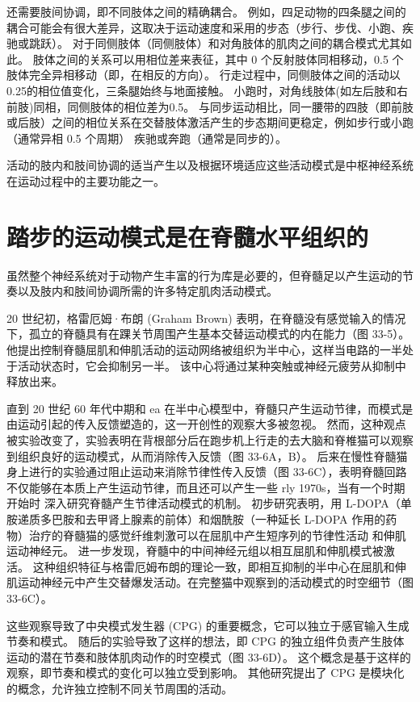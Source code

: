 还需要肢间协调，即不同肢体之间的精确耦合。 例如，四足动物的四条腿之间的耦合可能会有很大差异，这取决于运动速度和采用的步态（步行、步伐、小跑、疾驰或跳跃）。 对于同侧肢体（同侧肢体）和对角肢体的肌肉之间的耦合模式尤其如此。 肢体之间的关系可以用相位差来表征，其中 0 个反射肢体同相移动，0.5 个肢体完全异相移动（即，在相反的方向）。 行走过程中，同侧肢体之间的活动以0.25的相位值变化，三条腿始终与地面接触。 小跑时，对角线肢体(如左后肢和右前肢)同相，同侧肢体的相位差为0.5。 与同步运动相比，同一腰带的四肢（即前肢或后肢）之间的相位关系在交替肢体激活产生的步态期间更稳定，例如步行或小跑（通常异相 0.5 个周期） 疾驰或奔跑（通常是同步的）。

活动的肢内和肢间协调的适当产生以及根据环境适应这些活动模式是中枢神经系统在运动过程中的主要功能之一。


\section{踏步的运动模式是在脊髓水平组织的}
虽然整个神经系统对于动物产生丰富的行为库是必要的，但脊髓足以产生运动的节奏以及肢内和肢间协调所需的许多特定肌肉活动模式。

20 世纪初，格雷厄姆·布朗 (Graham Brown) 表明，在脊髓没有感觉输入的情况下，孤立的脊髓具有在踝关节周围产生基本交替运动模式的内在能力（图 33-5）。 他提出控制脊髓屈肌和伸肌活动的运动网络被组织为半中心，这样当电路的一半处于活动状态时，它会抑制另一半。 该中心将通过某种突触或神经元疲劳从抑制中释放出来。

直到 20 世纪 60 年代中期和 ea 在半中心模型中，脊髓只产生运动节律，而模式是由运动引起的传入反馈塑造的，这一开创性的观察大多被忽视。 然而，这种观点被实验改变了，实验表明在背根部分后在跑步机上行走的去大脑和脊椎猫可以观察到组织良好的运动模式，从而消除传入反馈（图 33-6A，B）。 后来在慢性脊髓猫身上进行的实验通过阻止运动来消除节律性传入反馈（图 33-6C），表明脊髓回路不仅能够在本质上产生运动节律，而且还可以产生一些 rly 1970s，当有一个时期开始时 深入研究脊髓产生节律活动模式的机制。 初步研究表明，用 L-DOPA（单胺递质多巴胺和去甲肾上腺素的前体）和烟酰胺（一种延长 L-DOPA 作用的药物）治疗的脊髓猫的感觉纤维刺激可以在屈肌中产生短序列的节律性活动 和伸肌运动神经元。 进一步发现，脊髓中的中间神经元组以相互屈肌和伸肌模式被激活。 这种组织特征与格雷厄姆布朗的理论一致，即相互抑制的半中心在屈肌和伸肌运动神经元中产生交替爆发活动。在完整猫中观察到的活动模式的时空细节（图 33-6C）。

这些观察导致了中央模式发生器 (CPG) 的重要概念，它可以独立于感官输入生成节奏和模式。 随后的实验导致了这样的想法，即 CPG 的独立组件负责产生肢体运动的潜在节奏和肢体肌肉动作的时空模式（图 33-6D）。 这个概念是基于这样的观察，即节奏和模式的变化可以独立受到影响。 其他研究提出了 CPG 是模块化的概念，允许独立控制不同关节周围的活动。

